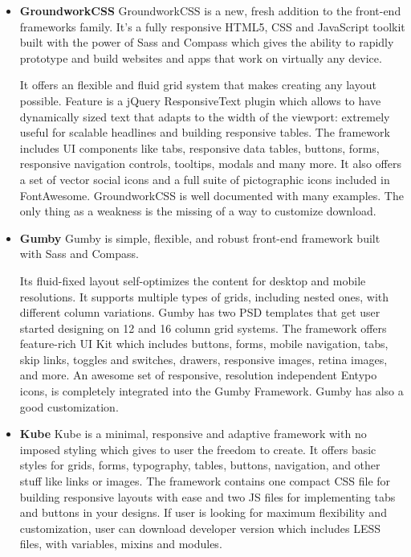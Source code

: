 \begin{itemize}
	\item \textbf{GroundworkCSS}
	\newline
	GroundworkCSS is a new, fresh addition to the front-end frameworks family. It's a fully responsive HTML5, CSS and JavaScript toolkit built with the power of Sass and Compass which gives the ability to rapidly prototype and build websites and apps that work on virtually any device.

	It offers an flexible and fluid grid system that makes creating any layout possible. Feature is a jQuery ResponsiveText plugin which allows to have dynamically sized text that adapts to the width of the viewport: extremely useful for scalable headlines and building responsive tables. The framework includes UI components like tabs, responsive data tables, buttons, forms, responsive navigation controls, tooltips, modals and many more. It also offers a set of vector social icons and a full suite of pictographic icons included in FontAwesome. GroundworkCSS is well documented with many examples. The only thing as a weakness is the missing of a way to customize download.

	\item \textbf{Gumby}            
	\newline
	Gumby is simple, flexible, and robust front-end framework built with Sass and Compass.
 
	Its fluid-fixed layout self-optimizes the content for desktop and mobile resolutions. It supports multiple types of grids, including nested ones, with different column variations. Gumby has two PSD templates that get user started designing on 12 and 16 column grid systems. The framework offers feature-rich UI Kit which includes buttons, forms, mobile navigation, tabs, skip links, toggles and switches, drawers, responsive images, retina images, and more. An awesome set of responsive, resolution independent Entypo icons, is completely integrated into the Gumby Framework. Gumby has also a good customization. 
	
	\item \textbf{Kube}
	\newline
    Kube is a minimal, responsive and adaptive framework with no imposed styling which gives to user the freedom to create. It offers basic styles for grids, forms, typography, tables, buttons, navigation, and other stuff like links or images. The framework contains one compact CSS file for building responsive layouts with ease and two JS files for implementing tabs and buttons in your designs. If user is looking for maximum flexibility and customization, user can download developer version which includes LESS files, with variables, mixins and modules.
	\end{itemize}

